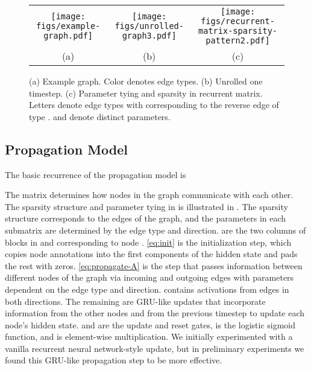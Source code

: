 \documentclass{article} \usepackage{iclr2016_conference,times}
\begin{document}
\begin{figure}[t]
\begin{center}
\begin{tabular}{ccc}
\texttt{[image: figs/example-graph.pdf]} &
\texttt{[image: figs/unrolled-graph3.pdf]} &
\texttt{[image: figs/recurrent-matrix-sparsity-pattern2.pdf]}
\\
(a) & (b) & (c) 
\end{tabular}
\end{center}
\vspace{-10pt}
\caption{
  (a) Example graph. Color denotes edge types.
  (b) Unrolled one timestep.
  (c) Parameter tying and sparsity in recurrent matrix. Letters denote
  edge types with  corresponding to the reverse edge of type .
   and  denote distinct parameters.
}
\label{fig:graphs-and-sparsity}
\end{figure}


\subsection{Propagation Model}

The basic recurrence of the propagation model is 
\begin{center}
\small
\begin{minipage}{.48\linewidth}

\end{minipage}
\hfill
\begin{minipage}{.48\linewidth}

\end{minipage}
\end{center}

The matrix  determines
how nodes in the graph communicate with each other. The sparsity
structure and parameter tying in  is illustrated in
. The sparsity structure corresponds to the
edges of the graph, and the parameters in each
submatrix are determined by the edge type and direction.
 are the two columns of blocks
in  and  corresponding to node .
\eqref{eq:init} is the initialization step, which copies node annotations
into the first components of the hidden state and pads the rest with
zeros.  \eqref{eq:propagate-A} is the step that passes information
between different nodes of the graph via incoming and outgoing edges
with parameters dependent on the edge type and direction.
 contains activations from edges in both
directions.
The remaining are GRU-like updates that incorporate information from the
other nodes and from the previous timestep to update each node's
hidden state.   and  are the update and
reset gates,  is the logistic sigmoid
function, and  is element-wise multiplication. We initially experimented with
a vanilla recurrent neural network-style update, but in preliminary
experiments we found this GRU-like propagation step to be more
effective.
\end{document}
